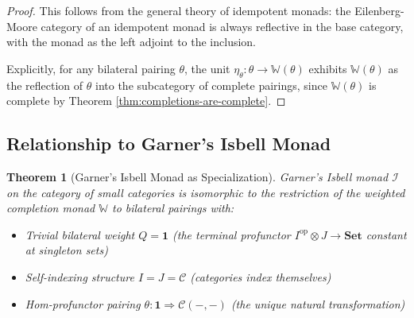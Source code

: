 \documentclass[11pt]{article}
\theoremstyle{plain}
\newtheorem{theorem}{Theorem}[section]
\theoremstyle{definition}
\theoremstyle{remark}
\newcommand{\C}{\mathcal{C}}
\newcommand{\op}{\mathrm{op}}
\begin{document}
\begin{proof}
This follows from the general theory of idempotent monads: the Eilenberg-Moore category of an idempotent monad is always reflective in the base category, with the monad as the left adjoint to the inclusion.

Explicitly, for any bilateral pairing $\theta$, the unit $\eta_\theta : \theta \to \mathbb{W}(\theta)$ exhibits $\mathbb{W}(\theta)$ as the reflection of $\theta$ into the subcategory of complete pairings, since $\mathbb{W}(\theta)$ is complete by Theorem \ref{thm:completions-are-complete}.
\end{proof}

\subsection{Relationship to Garner's Isbell Monad}

\begin{theorem}[Garner's Isbell Monad as Specialization]\label{thm:garner-specialization}
Garner's Isbell monad $\mathcal{I}$ on the category of small categories \cite{garner2018isbell} is isomorphic to the restriction of the weighted completion monad $\mathbb{W}$ to bilateral pairings with:
\begin{itemize}
\item Trivial bilateral weight $Q = \mathbf{1}$ (the terminal profunctor $I^{\op} \otimes J \to \mathbf{Set}$ constant at singleton sets)
\item Self-indexing structure $I = J = \C$ (categories index themselves)  
\item Hom-profunctor pairing $\theta : \mathbf{1} \Rightarrow \C(-, -)$ (the unique natural transformation)
\end{itemize}
\end{theorem}
\end{document}
